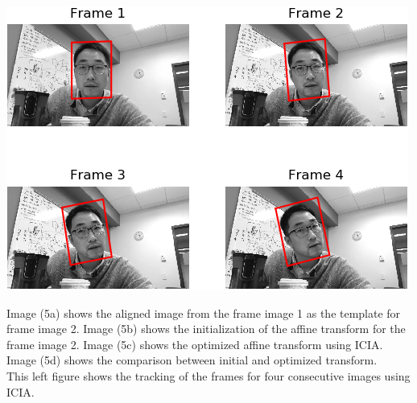 \documentclass[11pt]{scrartcl}
\begin{document}
\begin{minipage}{0.45\textwidth}
	\includegraphics[width=0.9\linewidth]{ICIA_track.png}
\end{minipage}
\begin{minipage}{0.5\textwidth}\raggedright
	\quad Image (5a) shows the aligned image from the frame image 1 as the template for frame image 2. Image (5b) shows the initialization of the affine transform for the frame image 2. Image (5c) shows the optimized affine transform using ICIA. Image (5d) shows the comparison between initial and optimized transform.
	\\
	\quad This left figure shows the tracking of the frames for four consecutive images using ICIA.
\end{minipage}










\nocite*{}  


\end{document}
